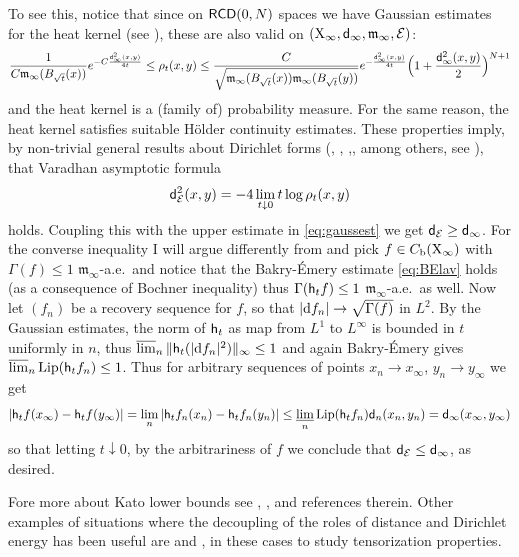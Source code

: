 \documentclass[11pt]{article}
\numberwithin{equation}{section}
\newcommand{\X}{{\rm X}}
\newcommand{\sfd}{{\sf d}}
\newcommand{\mm}{{\mathfrak m}}
\newcommand{\RCD}{{\sf RCD}}
\renewcommand{\d}{{\rm d}}
\newcommand{\Lip}{{\rm Lip}}
\newcommand{\lims}{\varlimsup}
\newcommand{\limi}{\varliminf}
\renewcommand{\b}{{\rm b}}
\newcommand{\h}{{\sf h}} %
\begin{document}
{{To see this, notice that  since on $\RCD(0,N)$ spaces we have Gaussian estimates for the heat kernel (see \cite{Sturm96III}), these are also valid on $(\X_\infty,\sfd_\infty,\mm_\infty,\mathcal E)$:
\begin{equation}
\label{eq:gaussest}
\frac{1}{C \mm_\infty(B_{\sqrt t}(x))}e^{-C\frac{\sfd_\infty^2(x,y)}{4t}}\leq\rho_t(x,y)\leq \frac{C}{\sqrt{\mm_\infty(B_{\sqrt t}(x))\mm_\infty(B_{\sqrt t}(y))}}e^{-\frac{\sfd_\infty^2(x,y)}{4t}}\Big(1+\frac{\sfd_\infty^2(x,y)}{2}\Big)^{N+1}
\end{equation}
and the heat  kernel is a (family of) probability measure. For the same reason, the heat kernel satisfies suitable H\"older continuity estimates. These properties imply, by non-trivial general results about Dirichlet forms (\cite{Sturm96I}, \cite{Ram01}, \cite{ERS07},\cite{Gri10}, \cite{CarTew22} among others, see \cite[Appendix C]{CMTkatoI}), that Varadhan asymptotic formula 
\begin{equation}
\label{eq:varadhan}
\sfd^2_{\mathcal E}(x,y)=-4\lim_{t\downarrow0}t\log\rho_t(x,y)
\end{equation}
holds. Coupling this with the upper estimate in \eqref{eq:gaussest} we get $\sfd_{\mathcal E}\geq \sfd_\infty$. For the converse inequality I will argue differently from \cite{CMTkatoI} and pick $f\in C_\b(\X_\infty)$ with $\Gamma(f)\leq 1$ $\mm_\infty$-a.e.\ and notice that the Bakry-\'Emery estimate \eqref{eq:BElav} holds (as a consequence of Bochner inequality) thus $\Gamma(\h_t f)\leq 1$ $\mm_\infty$-a.e.\ as well. Now let   $(f_n)$ be a recovery sequence for $f$, so that $|\d f_n|\to \sqrt{\Gamma(f)}$ in $L^2$. By the Gaussian estimates, the norm of $\h_t$ as map from $L^1$ to $L^\infty$ is bounded in $t$ uniformly in $n$, thus $\lims_n\|\h_t(|\d f_n|^2)\|_\infty\leq1$ and again Bakry-\'Emery gives $\lims_n\Lip(\h_t f_n)\leq 1$. Thus for arbitrary sequences of points $x_n\to x_\infty$, $y_n\to y_\infty$ we get 
\[
|\h_tf(x_\infty)-\h_tf(y_\infty)|=\lim_n|\h_tf_n(x_n)-\h_tf_n(y_n)|\leq \limi_n\Lip(\h_tf_n)\sfd_n(x_n,y_n)=\sfd_\infty(x_\infty,y_\infty)
\]
so that letting $t\downarrow0$, by the arbitrariness of $f$ we conclude that $\sfd_{\mathcal E}\leq \sfd_\infty$, as desired.

Fore more about Kato lower bounds see \cite{Ket21}, \cite{ERST22}, \cite{CMTkatoII} and references therein. Other examples of situations where the decoupling of the roles of distance and Dirichlet energy has been useful are \cite{AmbrosioGigliSavare12} and \cite{BSR22},  in these cases to study  tensorization properties. 

}}
\end{document}
